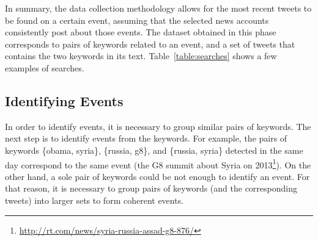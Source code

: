 In summary, the data collection methodology allows for the most recent tweets to
be found on a certain event, assuming that the selected news accounts
consistently post about those events. 
%
The dataset obtained in this phase corresponds to pairs of keywords related to
an event, and a set of tweets that contains the two keywords in its text.
%
Table~\ref{table:searches} shows a few examples of searches.


\subsection{Identifying Events}

In order to identify events, it is necessary to group similar pairs of keywords.
%
The next step is to identify events from the keywords. 
%
For example, the pairs of keywords \{obama, syria\}, \{russia, g8\}, and
\{russia, syria\} detected in the same day correspond to the same event (the G8
summit about Syria on
2013\footnote{\url{http://rt.com/news/syria-russia-assad-g8-876/}}). 
%
On the other hand, a sole pair of keywords could be not enough to identify an
event. 
%
For that reason, it is necessary to group pairs of keywords (and the
corresponding tweets) into larger sets to form coherent events. 



